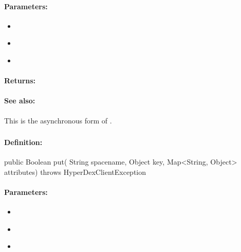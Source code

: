 \paragraph{Parameters:}
\begin{itemize}[noitemsep]
\item {}\\

\item {}\\

\item {}\\

\end{itemize}

\paragraph{Returns:}


\paragraph{See also:}  This is the asynchronous form of .

\pagebreak
\subsubsection{}
\label{api:java:put}


\paragraph{Definition:}
\begin{javacode}
public Boolean put(
        String spacename,
        Object key,
        Map<String, Object> attributes) throws HyperDexClientException
\end{javacode}

\paragraph{Parameters:}
\begin{itemize}[noitemsep]
\item {}\\

\item {}\\

\item {}\\

\end{itemize}

